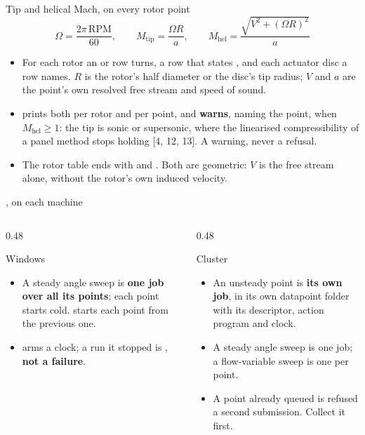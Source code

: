 \begin{frame}{Tip and helical Mach, on every rotor point}
\[ \Omega = \frac{2\pi\,\mathrm{RPM}}{60}, \qquad
   M_\mathrm{tip} = \frac{\Omega R}{a}, \qquad
   M_\mathrm{hel} = \frac{\sqrt{V^2 + (\Omega R)^2}}{a} \]
\begin{itemize}\small
  \item For each rotor an  or  row
        turns, a  row that states , and each actuator
        disc a row names. \(R\)
        is the rotor's half diameter or the disc's tip radius; \(V\) and
        \(a\) are the point's own resolved free stream and speed of sound.
  \item {} prints both per rotor and per point, and \textbf{warns},
        naming the point, when \(M_\mathrm{hel} \ge 1\): the tip is sonic or
        supersonic, where the linearised compressibility of a panel method
        stops holding [4, 12, 13]. A warning, never a refusal.
  \item The rotor table ends with  and
        . Both are geometric: \(V\) is the free stream
        alone, without the rotor's own induced velocity.
\end{itemize}
\end{frame}

\begin{frame}{, on each machine}
\begin{columns}[T]
\begin{column}{0.48\textwidth}
\begin{block}{Windows}
\begin{itemize}\small
  \item A steady angle sweep is \textbf{one job over all its points}; each
        point starts cold.  starts each point from
        the previous one.
  \item {} arms a clock; a run it stopped is
        , \textbf{not a failure}.
\end{itemize}
\end{block}
\end{column}
\begin{column}{0.48\textwidth}
\begin{block}{Cluster}
\begin{itemize}\small
  \item An unsteady point is \textbf{its own job}, in its own datapoint folder
        with its descriptor, action program and clock.
  \item A steady angle sweep is one job; a flow-variable sweep is one per point.
  \item A point already queued is refused a second submission. Collect it
        first.
\end{itemize}
\end{block}
\end{column}
\end{columns}
\end{frame}

